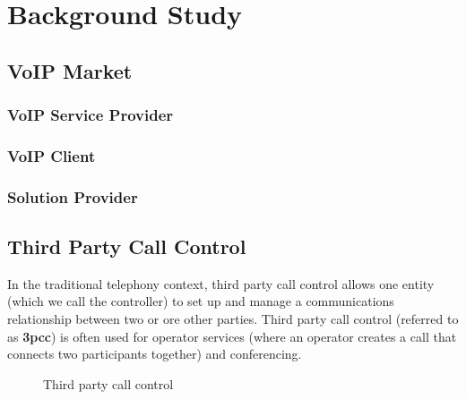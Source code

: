 \chapter{Background Study}
\label{sec:BackgroundStudy}

\section{VoIP Market}
\label{sec:BackgroundStudy:VoIPMarket}


\subsection{VoIP Service Provider}
\label{sec:BackgroundStudy:VoIPMarket}

\subsection{VoIP Client}

\subsection{Solution Provider}



\section{Third Party Call Control}

In the traditional telephony context, third party call control allows one entity (which we call the controller) to set up and manage a communications relationship between two or ore other parties.  Third party call control (referred to as \textbf{3pcc}\label{sym:3pcc}) is often used for operator
services (where an operator creates a call that connects two participants together) and conferencing.\cite{RFC3725}

\begin{figure}
\centering
{}
\caption{Third party call control}
\end{figure}

